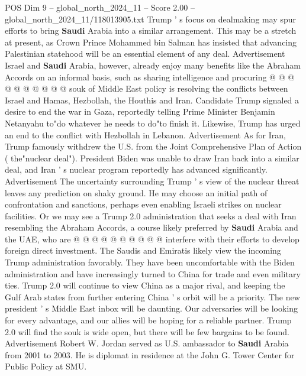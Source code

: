 \begin{textsample}{POS Dim 9 – global\_north\_2024\_11 – Score 2.00 – global\_north\_2024\_11/118013905.txt}
Trump ' s focus on dealmaking may spur efforts to bring \textbf{Saudi} Arabia into a similar arrangement.
This may be a stretch at present, as Crown Prince Mohammed bin Salman has insisted that advancing Palestinian statehood will be an essential element of any deal.
Advertisement Israel and \textbf{Saudi} Arabia, however, already enjoy many benefits like the Abraham Accords on an informal basis, such as sharing intelligence and procuring @ @ @ @ @ @ @ @ @ @ souk of Middle East policy is resolving the conflicts between Israel and Hamas, Hezbollah, the Houthis and Iran.
Candidate Trump signaled a desire to end the war in Gaza, reportedly telling Prime Minister Benjamin Netanyahu to"do whatever he needs to do"to finish it.
Likewise, Trump has urged an end to the conflict with Hezbollah in Lebanon.
Advertisement As for Iran, Trump famously withdrew the U.S. from the Joint Comprehensive Plan of Action ( the"nuclear deal").
President Biden was unable to draw Iran back into a similar deal, and Iran ' s nuclear program reportedly has advanced significantly.
Advertisement The uncertainty surrounding Trump ' s view of the nuclear threat leaves any prediction on shaky ground.
He may choose an initial path of confrontation and sanctions, perhaps even enabling Israeli strikes on nuclear facilities.
Or we may see a Trump 2.0 administration that seeks a deal with Iran resembling the Abraham Accords, a course likely preferred by \textbf{Saudi} Arabia and the UAE, who are @ @ @ @ @ @ @ @ @ @ interfere with their efforts to develop foreign direct investment.
The Saudis and Emiratis likely view the incoming Trump administration favorably.
They have been uncomfortable with the Biden administration and have increasingly turned to China for trade and even military ties.
Trump 2.0 will continue to view China as a major rival, and keeping the Gulf Arab states from further entering China ' s orbit will be a priority.
The new president ' s Middle East inbox will be daunting.
Our adversaries will be looking for every advantage, and our allies will be hoping for a reliable partner.
Trump 2.0 will find the souk is wide open, but there will be few bargains to be found.
Advertisement Robert W.
Jordan served as U.S. ambassador to \textbf{Saudi} Arabia from 2001 to 2003.
He is diplomat in residence at the John G.
Tower Center for Public Policy at SMU.

\end{textsample}
